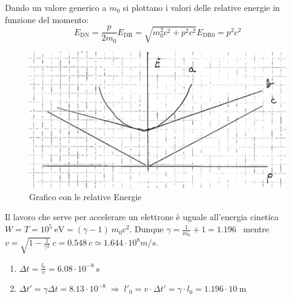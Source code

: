 \documentclass[12pt,twoside,a4]{article}
\begin{document}
\begin{solution}
	 Dando un valore generico a $m_0$ si plottano i valori delle relative energie in funzione del momento: 
\begin{equation*}
    E_{\mathrm{DN}} = \frac{p}{2 m_0}     E_{\mathrm{DR}} = \sqrt{m^2_0 c^2 + p^2 c^2}    E_{\mathrm{DR0}} = p^2 c^2 
\end{equation*} 
 


 \begin{figure}[H]
	   \centering
\includegraphics[height=0.25  \linewidth]{graf.pdf}
		     
		        \caption{\centering Grafico con le relative Energie}
        \end{figure}
\end{solution}


\newpage
\begin{solution}
	 Il lavoro che serve per accelerare un elettrone è uguale all'energia cinetica $W = T = 10^5 \ \mathrm{eV} = (\gamma -1) \ m_0 c^2$. Dunque $\gamma = \frac{1}{m_0} +1 = 1.196$ \  mentre \ $v = \sqrt{1 - \frac{1}{\gamma^2}} \ c = 0.548 \ c \simeq 1.644 \cdot 10^8 m/s$. 
 
 \begin{enumerate}[label=(\textit{\roman*})]
 \item $\Delta t = \frac{l_0}{v} = 6.08 \cdot 10^{-8} \ \mathrm{s}$ 
 
 \item $\Delta t' = \gamma \Delta t = 8.13 \cdot 10^{-8} \; \Rightarrow \; l'_0 = v \cdot \Delta t' = \gamma \cdot l_0 = 1.196 \cdot 10 \ \mathrm{m}$
 \end{enumerate}
\end{solution}
\end{document}
